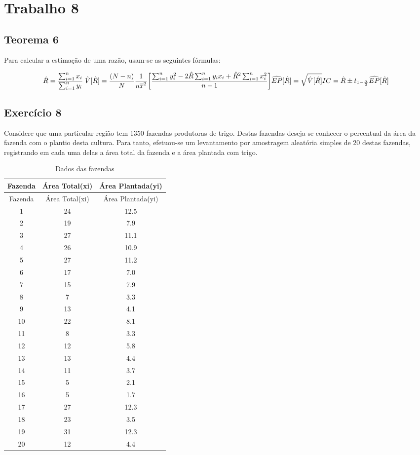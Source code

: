 \documentclass[]{article}
\begin{document}
\section{Trabalho 8}\label{trabalho-8}

\subsection{Teorema 6}\label{teorema-6}

Para calcular a estimação de uma razão, usam-se as seguintes fórmulas:

\[
\hat{R}=\dfrac{\sum_{i=1}^nx_i}{\sum_{i=1}^ny_i}\\\;
\hat{V}[\hat{R}]=\dfrac{(N-n)}{N}\dfrac{1}{n\overline{x}^2}\bigg[\dfrac{\sum_{i=1}^ny_i^2-2\hat{R}\sum_{i=1}^ny_ix_i+\hat{R}^2\sum_{i=1}^nx_i^2}{n-1}\bigg]\\
\widehat{EP}[\hat{R}]=\sqrt{\hat{V}[\hat{R}]}\\
IC= \hat{R}\pm t_{1-\frac{\alpha}{2}}\widehat{EP}[\hat{R}]
\]

\subsection{Exercício 8}\label{exercicio-8}

Considere que uma particular região tem 1350 fazendas produtoras de
trigo. Destas fazendas deseja-se conhecer o percentual da área da
fazenda com o plantio desta cultura. Para tanto, efetuou-se um
levantamento por amostragem aleatória simples de 20 destas fazendas,
registrando em cada uma delas a área total da fazenda e a área plantada
com trigo.

\begin{longtable}[]{@{}ccc@{}}
\caption{Dados das fazendas}\tabularnewline
\toprule
Fazenda & Área Total(xi) & Área Plantada(yi)\tabularnewline
\midrule
\endfirsthead
\toprule
Fazenda & Área Total(xi) & Área Plantada(yi)\tabularnewline
\midrule
\endhead
1 & 24 & 12.5\tabularnewline
2 & 19 & 7.9\tabularnewline
3 & 27 & 11.1\tabularnewline
4 & 26 & 10.9\tabularnewline
5 & 27 & 11.2\tabularnewline
6 & 17 & 7.0\tabularnewline
7 & 15 & 7.9\tabularnewline
8 & 7 & 3.3\tabularnewline
9 & 13 & 4.1\tabularnewline
10 & 22 & 8.1\tabularnewline
11 & 8 & 3.3\tabularnewline
12 & 12 & 5.8\tabularnewline
13 & 13 & 4.4\tabularnewline
14 & 11 & 3.7\tabularnewline
15 & 5 & 2.1\tabularnewline
16 & 5 & 1.7\tabularnewline
17 & 27 & 12.3\tabularnewline
18 & 23 & 3.5\tabularnewline
19 & 31 & 12.3\tabularnewline
20 & 12 & 4.4\tabularnewline
\bottomrule
\end{longtable}
\end{document}

